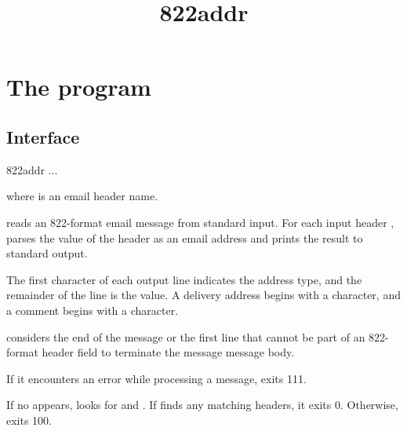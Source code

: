 \documentclass{book}
\title{822addr}
\begin{document}
\section{The  program}

\subsection{Interface}
\begin{code}
  822addr  ...
\end{code}
where  is an email header name.

 reads an 822-format email message from standard input.
For each input header ,  parses
the value of the header as an email address and prints the result to
standard output.

The first character of each output line indicates the address type,
and the remainder of the line is the value.  A delivery address
begins with a \cmd{+} character, and a comment begins with a \cmd{(} character.

 considers the end of the message or the first line that
cannot be part of an 822-format header field to terminate the message
message body.

If it encounters an error while processing a message,
 exits 111.

If no  appears,  looks for  and .
If  finds any matching headers, it exits 0.
Otherwise,  exits 100.
\end{document}
